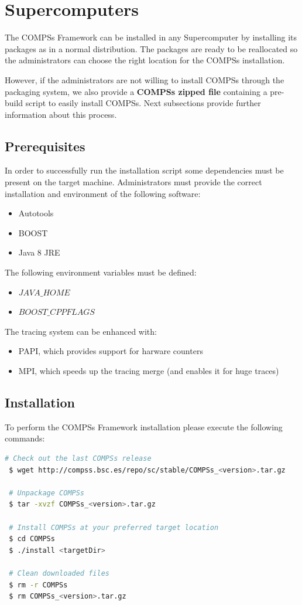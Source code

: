 \section{Supercomputers}
\label{sec:Supercomputers}

The COMPSs Framework can be installed in any Supercomputer by installing its packages as in a normal distribution. The packages are
ready to be reallocated so the administrators can choose the right location for the COMPSs installation. \newline

However, if the administrators are not willing to install COMPSs through the packaging system, we also provide a \textbf{COMPSs 
zipped file} containing a pre-build script to easily install COMPSs. Next subsections provide further information about this process.


\subsection{Prerequisites}
\label{subsec:supercomputers_prerequisites}
In order to successfully run the installation script some dependencies must be present on the target machine. Administrators must 
provide the correct installation and environment of the following software:
\begin{itemize}
 \item Autotools
 \item BOOST
 \item Java 8 JRE
\end{itemize}

The following environment variables must be defined:
\begin{itemize}
 \item $JAVA\_HOME$
 \item $BOOST\_CPPFLAGS$
\end{itemize}

The tracing system can be enhanced with:
\begin{itemize}
 \item PAPI, which provides support for harware counters
 \item MPI, which speeds up the tracing merge (and enables it for huge traces)
\end{itemize}


\subsection{Installation}
To perform the COMPSs Framework installation please execute the following commands:
\begin{lstlisting}[language=bash]
 # Check out the last COMPSs release
 $ wget http://compss.bsc.es/repo/sc/stable/COMPSs_<version>.tar.gz

 # Unpackage COMPSs
 $ tar -xvzf COMPSs_<version>.tar.gz
 
 # Install COMPSs at your preferred target location
 $ cd COMPSs
 $ ./install <targetDir>
 
 # Clean downloaded files
 $ rm -r COMPSs
 $ rm COMPSs_<version>.tar.gz
\end{lstlisting}


